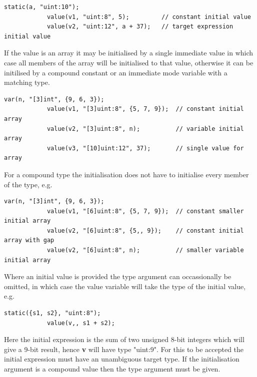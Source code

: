         \begin{lstlisting}[gobble=12, language=threepl]
            static(a, "uint:10");
            value(v1, "uint:8", 5);         // constant initial value
            value(v2, "uint:12", a + 37);   // target expression initial value
        \end{lstlisting}

        If the value is an array it may be initialised by a single immediate
        value in which case all members of the array will be initialised to
        that value, otherwise it can be initilised by a compound constant or
        an immediate mode variable with a matching type.
        
        \begin{lstlisting}[gobble=12, language=threepl]
            var(n, "[3]int", {9, 6, 3});
            value(v1, "[3]uint:8", {5, 7, 9});  // constant initial array
            value(v2, "[3]uint:8", n);          // variable initial array
            value(v3, "[10]uint:12", 37);       // single value for array
        \end{lstlisting}
        
        For a compound type the initialisation does not have to initialise
        every member of the type, e.g.
        
        \begin{lstlisting}[gobble=12, language=threepl]
            var(n, "[3]int", {9, 6, 3});
            value(v1, "[6]uint:8", {5, 7, 9});  // constant smaller initial array
            value(v2, "[6]uint:8", {5,, 9});    // constant initial array with gap
            value(v2, "[6]uint:8", n);          // smaller variable initial array
        \end{lstlisting}
        
        Where an initial value is provided the type argument can occassionally
        be omitted, in which case the value variable will take the type of the
        initial value, e.g.
        
        \begin{lstlisting}[gobble=12, language=threepl]
            static({s1, s2}, "uint:8");
            value(v,, s1 + s2);
        \end{lstlisting}
        
        Here the initial expression is the sum of two unsigned 8-bit integers
        which will give a 9-bit result, hence {\bf v} will have type "uint:9".
        For this to be accepted the initial expression must have an
        unambiguous target type. If the initialisation argument is a compound
        value then the type argument must be given.

